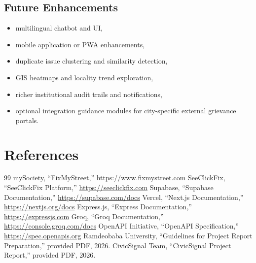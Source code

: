 \documentclass[12pt,a4paper]{report}
\begin{document}
\section{Future Enhancements}
\begin{itemize}
  \item multilingual chatbot and UI,
  \item mobile application or PWA enhancements,
  \item duplicate issue clustering and similarity detection,
  \item GIS heatmaps and locality trend exploration,
  \item richer institutional audit trails and notifications,
  \item optional integration guidance modules for city-specific external grievance portals.
\end{itemize}

\chapter*{References}
\begin{thebibliography}{99}
 mySociety, ``FixMyStreet,'' \url{https://www.fixmystreet.com}
 SeeClickFix, ``SeeClickFix Platform,'' \url{https://seeclickfix.com}
 Supabase, ``Supabase Documentation,'' \url{https://supabase.com/docs}
 Vercel, ``Next.js Documentation,'' \url{https://nextjs.org/docs}
 Express.js, ``Express Documentation,'' \url{https://expressjs.com}
 Groq, ``Groq Documentation,'' \url{https://console.groq.com/docs}
 OpenAPI Initiative, ``OpenAPI Specification,'' \url{https://spec.openapis.org}
 Ramdeobaba University, ``Guidelines for Project Report Preparation,'' provided PDF, 2026.
 CivicSignal Team, ``CivicSignal Project Report,'' provided PDF, 2026.
\end{thebibliography}

\appendix
\end{document}
